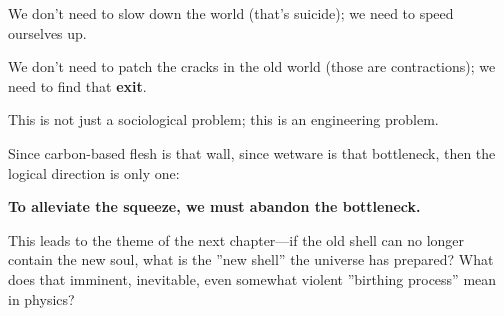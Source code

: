 We don't need to slow down the world (that's suicide); we need to speed ourselves up.

We don't need to patch the cracks in the old world (those are contractions); we need to find that \textbf{exit}.

This is not just a sociological problem; this is an engineering problem.

Since carbon-based flesh is that wall, since wetware is that bottleneck, then the logical direction is only one:

\textbf{To alleviate the squeeze, we must abandon the bottleneck.}

This leads to the theme of the next chapter---if the old shell can no longer contain the new soul, what is the ''new shell'' the universe has prepared? What does that imminent, inevitable, even somewhat violent ''birthing process'' mean in physics?

